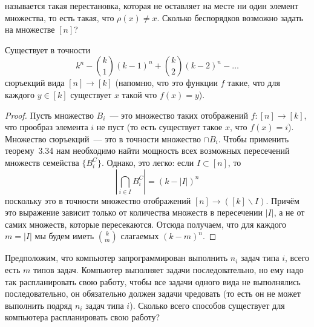 \begin{exercise}
 называется такая перестановка, которая не оставляет на месте ни один элемент множества, то есть такая, что $\rho(x)\not=x$. Сколько беспорядков возможно задать на множестве $[n]$?
\end{exercise}

\begin{thm}
Существует в точности
$$k^n - {k \choose 1}(k-1)^n + {k\choose 2}(k-2)^n -\ldots$$
сюръекций вида $[n]\to[k]$ (напомню, что это функции $f$ такие, что для каждого $y\in[k]$ существует $x$ такой что $f(x) = y$).
\end{thm}
\begin{proof}
Пусть множество $B_i$~--- это множество таких отображений $f:[n]\to[k]$, что прообраз элемента $i$ не пуст (то есть существует такое $x$, что $f(x) = i$). Множество сюръекций~--- это в точности множество $\cap B_i$. Чтобы применить теорему~3.34 нам необходимо найти мощность всех возможных пересечений множеств семейства $\{B_i^C\}$. Однако, это легко: если $I\subset [n]$, то
$$\left|\bigcap_{i\in I} B_i^C\right| = (k-|I|)^n$$
поскольку это в точности множество отображений $[n]\to([k]\backslash I)$. Причём это выражение зависит только от количества множеств в пересечении $|I|$, а не от самих множеств, которые пересекаются. Отсюда получаем, что для каждого $m = |I|$ мы будем иметь $k\choose m$ слагаемых $(k-m)^n$.
\end{proof}

\begin{exercise}
Предположим, что компьютер запрограммирован выполнить $n_i$ задач типа $i$, всего есть $m$ типов задач. Компьютер выполняет задачи последовательно, но ему надо так распланировать свою работу, чтобы все задачи одного вида не выполнялись последовательно, он обязательно должен задачи чредовать (то есть он не может выполнить подряд $n_i$ задач типа $i$). Сколько всего способов существует для компьютера распланировать свою работу?
\end{exercise}